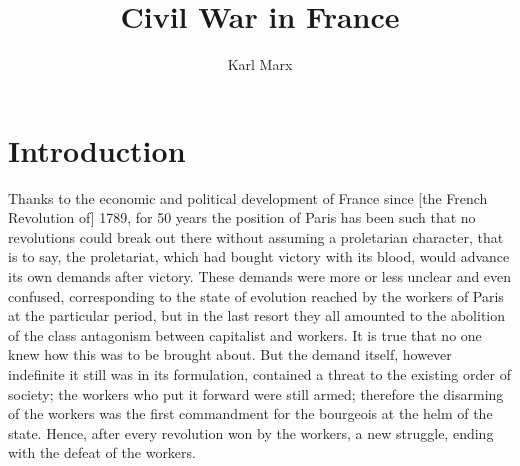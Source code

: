 \documentclass{book}
\begin{document}
\title{Civil War in France}
\author{Karl Marx}

\maketitle

\chapter{Introduction}

Thanks to the economic and political development of France since [the
French Revolution of] 1789, for 50 years the position of Paris has been
such that no revolutions could break out there without assuming
a proletarian character, that is to say, the proletariat, which had bought
victory with its blood, would advance its own demands after victory. These
demands were more or less unclear and even confused, corresponding to the
state of evolution reached by the workers of Paris at the particular
period, but in the last resort they all amounted to the abolition of the
class antagonism between capitalist and workers. It is true that no one
knew how this was to be brought about. But the demand itself, however
indefinite it still was in its formulation, contained a threat to the
existing order of society; the workers who put it forward were still
armed; therefore the disarming of the workers was the first commandment
for the bourgeois at the helm of the state. Hence, after every revolution
won by the workers, a new struggle, ending with the defeat of the workers.
\end{document}
